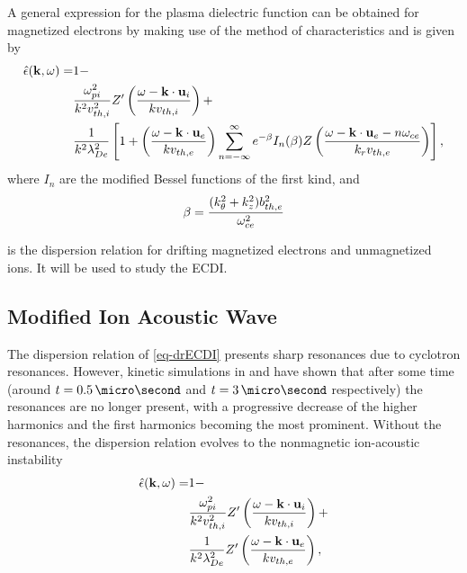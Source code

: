     \vspace{1em}
    A general expression for the plasma dielectric function can be obtained for magnetized electrons by making use of the method of characteristics and is given by
    \begin{equation} \label{eq-drECDI}
      \begin{split}
      \hat\epsilon({\mathbf k},\omega) =& 1 - \\
       &\frac{\omega_{pi}^2}{k^2 v^2_{th, i}} Z'\left( \frac{\omega - {\mathbf k} \cdot {\mathbf u_{i}}}{k v_{th, i}}  \right) + \\
       & \frac{1}{k^2 \lambda_{De}^2} \left[ 1 + \left(  \frac{\omega - {\mathbf k} \cdot {\mathbf u_{e}}}{k v_{th, e}} \right) \sum_{n=-\infty}^{\infty} e^{- \beta} I_n(\beta) Z\left(  \frac{\omega - {\mathbf k} \cdot {\mathbf u_{e} - n \ensuremath{\omega_{ce}}}}{k_{r} v_{th, e}} \right)  \right],
    \end{split}
    \end{equation}
    where $I_n$ are the modified Bessel functions of the first kind, and 
    \begin{equation} \label{eq-beta}
      \beta = \frac{(k_{\theta}^2 + k_z^2) b^2_{th, e}}{ \omega_{ce}^2}
    \end{equation}
    
     is the dispersion relation for drifting magnetized electrons and unmagnetized ions.
    It will be used to study the \acf{ECDI}.
    


  \subsection{Modified Ion Acoustic Wave}
    \label{sucsec-IAW}
    
    The dispersion relation of \cref{eq-drECDI} presents sharp resonances due to cyclotron resonances.
    However, kinetic simulations in \citet{janhunen2018} and \citet{taccogna2019} have shown that after some time (around  $t=0.5\,\micro\second$ and $t=3\,\micro\second$ respectively) the resonances are no longer present, with a progressive decrease of the higher harmonics and the first harmonics becoming the most prominent.
    Without the resonances, the dispersion relation evolves to the nonmagnetic ion-acoustic instability
    \begin{equation} \label{eq-drIAWgene}
      \begin{split}
      \hat\epsilon({\mathbf k},\omega) =& 1 - \\
       &\frac{\omega_{pi}^2}{k^2 v^2_{th, i}} Z'\left( \frac{\omega - {\mathbf k} \cdot {\mathbf u_{i}}}{k v_{th, i}}  \right) + \\
       & \frac{1}{k^2 \lambda_{De}^2}  Z'\left(  \frac{\omega - {\mathbf k} \cdot {\mathbf u_{e}}}{k v_{th, e}} \right) ,
    \end{split}
    \end{equation}

